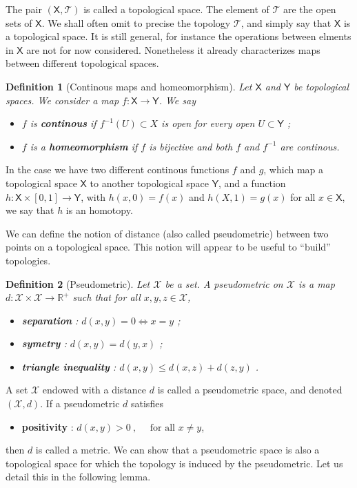 \documentclass[10pt]{book}
\newcommand{\Tcal}{\mathcal{T}}
\newcommand{\Xcal}{\mathcal{X}}
\newcommand{\Rbb}{\mathbb{R}}
\newcommand{\Xsf}{\mathsf{X}}
\newcommand{\Ysf}{\mathsf{Y}}
\theoremstyle{break}
\newtheorem{definition}{Definition}
\begin{document}
The pair $(\Xsf,\Tcal)$ is called a topological space. The element of $\Tcal$ are the open sets of $\Xsf$. We shall often omit to precise the topology $\Tcal$, and simply say that $\Xsf$ is a topological space. It is still general, for instance the operations between elments in $\Xsf$ are not for now considered. Nonetheless it already characterizes maps between different topological spaces.\par%


\begin{definition}[Continous maps and homeomorphism]
%
Let $\Xsf$ and $\Ysf$ be topological spaces. We consider a map $f : \Xsf \to \Ysf$. We say
%
\begin{itemize}
\item $f$ is \textbf{continous} if $f^{-1}(U) \subset X$ is open for every open $U \subset\Ysf$ ;
\item $f$ is a \textbf{homeomorphism} if $f$ is bijective and both $f$ and $f^{-1}$ are continous.
\end{itemize}
%
\end{definition}


In the case we have two different continous functions $f$ and $g$, which map a topological space $\Xsf$ to another topological space $\Ysf$, and a function $h : \Xsf \times [0,1] \to \Ysf$, with  $h(x,0) = f(x)$ and $h(X,1) = g(x)$ for all $x \in \Xsf$, we say that $h$ is an homotopy.


\bigskip


We can define the notion of distance (also called pseudometric) between two points on a topological space. This notion will appear to be useful to ``build'' topologies.


\begin{definition}[Pseudometric] 
Let $\Xcal$ be a set. A pseudometric on $\Xcal$ is a map $d : \Xcal \times \Xcal \to \Rbb^+$ such that for all $x, y, z \in \Xcal$,%
%
\begin{itemize}
\item \textbf{separation} : $d(x,y) = 0 \Leftrightarrow x=y$ ; 
\item \textbf{symetry} : $d(x,y) = d(y,x)$ ;
\item \textbf{triangle inequality} : $d(x,y) \leq d(x,z) + d(z,y)$ .
\end{itemize}
%
\end{definition}


A set $\Xcal$ endowed with a distance $d$ is called a pseudometric space, and denoted $(\Xcal,d)$. If a pseudometric $d$ satisfies%
%
\begin{itemize}
\item \textbf{positivity} : $d(x,y) > 0 \ , \quad \mbox{ for all } x \neq y$,
\end{itemize}
%
then $d$ is called a metric. We can show that a pseudometric space is also a topological space for which the topology is induced by the pseudometric. Let us detail this in the following lemma.
\end{document}
